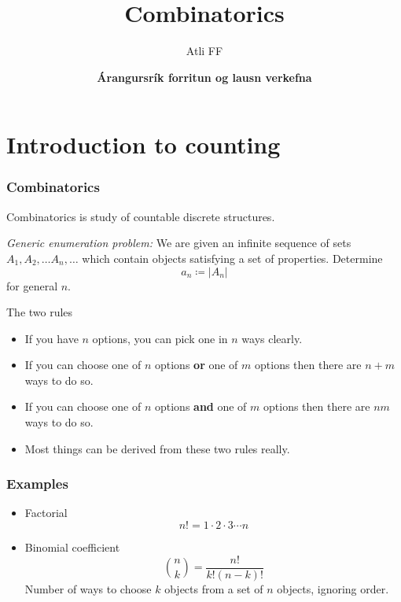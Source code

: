 \documentclass{beamer}
\title{Combinatorics}
\author{Atli FF}
\institute{\href{http://ru.is/td}{School of Computer Science} \\[2pt] \href{http://ru.is}{Reykjavík University}}
\date{\textbf{Árangursrík forritun og lausn verkefna}}
\begin{document}
\begin{frame}[plain]
    \titlepage
\end{frame}

\section*{Introduction to counting}

\begin{frame}[plain]
  \frametitle{Combinatorics}
  \vspace{30pt}
  Combinatorics is study of countable discrete structures.

  \vspace{10pt}
  \emph{Generic enumeration problem: } We are given an infinite sequence of
  sets $A_1, A_2, \ldots A_n, \ldots$ which contain objects satisfying a set of
  properties. Determine 
  \[
    a_n \coloneqq \lvert A_n \rvert
  \]
  for general $n$.
\end{frame}

\begin{frame}[plain]{The two rules}

\begin{itemize}

\item If you have $n$ options, you can pick one in $n$ ways clearly.

\item If you can choose one of $n$ options \textbf{or} one of $m$ options then there are $n + m$ ways to do so.

\item If you can choose one of $n$ options \textbf{and} one of $m$ options then there are $nm$ ways to do so.

\item Most things can be derived from these two rules really.

\end{itemize}

\end{frame}

\begin{frame}[plain]
  \frametitle{Examples}
  \vspace{30pt}
  \begin{itemize}
    \item Factorial %
      \[
        n! = 1\cdot 2 \cdot 3 \cdots n
      \]
    \item Binomial coefficient %
      \[
        \binom{n}{k} = \frac{n!}{k!(n-k)!}
      \]
      Number of ways to choose $k$ objects from a set of $n$ objects, ignoring order.
  \end{itemize}
\end{frame}
\end{document}
